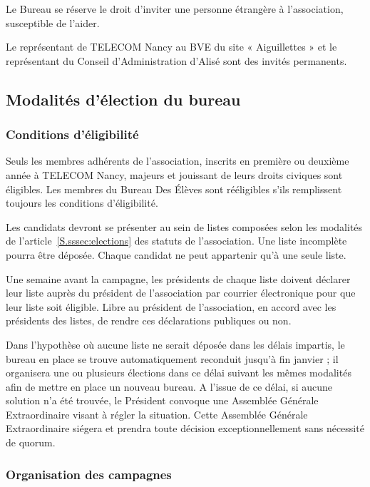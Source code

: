 \documentclass{article} %
\begin{document}
				Le Bureau se réserve le droit d’inviter une personne étrangère à
				l’association, susceptible de l’aider. 

				Le représentant de TELECOM Nancy au BVE du site « Aiguillettes »
				et le représentant du Conseil d’Administration d’Alisé sont des
				invités permanents.

		\subsection{Modalités d’élection du bureau}

			\subsubsection{Conditions d’éligibilité}
					
				Seuls les membres adhérents de l'association, inscrits en
				première ou deuxième année à TELECOM Nancy, majeurs et jouissant
				de leurs droits civiques sont éligibles. Les membres du Bureau
				Des Élèves sont rééligibles s’ils remplissent toujours les
				conditions d’éligibilité.

				Les candidats devront se présenter au sein de listes composées
				selon les modalités de l’article~\ref{S.sssec:elections} des
				statuts de l’association. Une liste incomplète pourra être
				déposée. Chaque candidat ne peut appartenir qu’à une seule
				liste.

				Une semaine avant la campagne, les présidents de chaque liste
				doivent déclarer leur liste auprès du président de l’association
				par courrier électronique pour que leur liste soit éligible.
				Libre au président de l’association, en accord avec les
				présidents des listes, de rendre ces déclarations publiques ou
				non.

				Dans l’hypothèse où aucune liste ne serait déposée dans les
				délais impartis, le bureau en place se trouve automatiquement
				reconduit jusqu’à fin janvier ; il organisera une ou plusieurs
				élections dans ce délai suivant les mêmes modalités afin de
				mettre en place un nouveau bureau. A l’issue de ce délai, si
				aucune solution n’a été trouvée, le Président convoque une
				Assemblée Générale Extraordinaire visant à régler la situation.
				Cette Assemblée Générale Extraordinaire siégera et prendra toute
				décision exceptionnellement sans nécessité de quorum.

			\clearpage

			\subsubsection{Organisation des campagnes}
\end{document}

